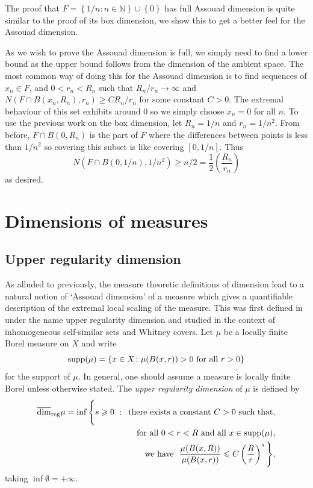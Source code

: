 The proof that $F=\left\{1/n \colon n \in \mathbb{N} \right\} \cup \left\{0 \right\}$ has full Assouad dimension is quite similar to the proof of its box dimension, we show this to get a better feel for the Assouad dimension.

As we wish to prove the Assouad dimension is full, we simply need to find a lower bound as the upper bound follows from the dimension of the ambient space. The most common way of doing this for the Assouad dimension is to find sequences of $x_n \in F$, and $0<r_n < R_n$ such that $R_n/r_n \rightarrow \infty$ and \newline 
$N(F \cap B(x_n, R_n), r_n ) \ge CR_n/r_n$ for some constant $C>0$. The extremal behaviour of this set exhibits around 0 so we simply choose $x_n = 0$ for all $n$. To use the previous work on the box dimension, let $R_n = 1/n$ and $r_n = 1/n^2$. From before, $F\cap B(0,R_n)$ is the part of $F$ where the differences between points is less than $1/n^2$ so covering this subset is like covering $[0,1/n]$. Thus
\[
N(F \cap B(0, 1/n), 1/n^2 ) \ge n/2 = \frac{1}{2} \left( \frac{R_n}{r_n}\right)
\]
as desired.





\section{Dimensions of measures}
\label{sec:intro-measures}

\subsection{Upper regularity dimension}
\label{sec:intro-upper-reg}

As alluded to previously, the measure theoretic definitions of dimension lead to a natural notion of `Assouad dimension' of a measure which gives a quantifiable description of the extremal local scaling of the measure. This was first defined in \cite{anti1,anti2} under the name upper regularity dimension and studied in the context of inhomogeneous self-similar sets and Whitney covers. Let $\mu$ be a locally finite Borel measure on $X$ and write $$\text{supp}(\mu) = \left\{ x \in X \colon \mu(B(x,r)) > 0 \textup{ for all } r > 0 \right\}$$ for the support of $\mu$. In general, one should assume a measure is locally finite Borel unless otherwise stated. The \textit{upper regularity dimension} of $\mu$ is defined by 
\begin{align*} 
\overline{\dim}_{\textup{reg}} \mu = \inf \Bigg\{ s \geqslant 0 \, \,  : \,  \text{ there exists a  constant }C  > 0\text{  such that,} \\ \text{for all } 0< r< R  \text{  and all }x \in \text{supp} (\mu), \\ \text{we have }  \  \frac{\mu(B(x,R))}{\mu(B(x,r))} \leqslant C\left(\frac{R}{r}\right)^{s} \Bigg\},
\end{align*}
taking $\inf \emptyset = + \infty$. 


